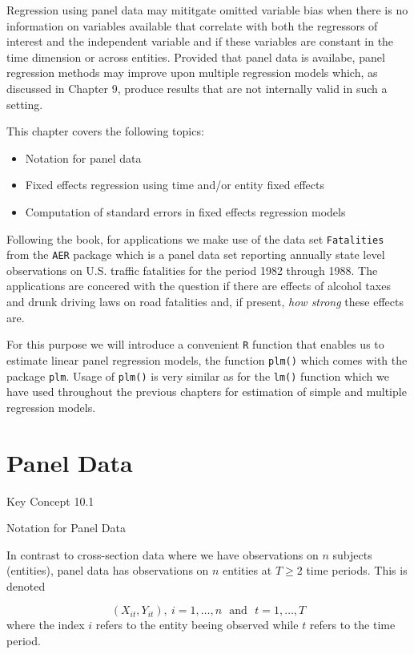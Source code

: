 \documentclass[]{book}
\providecommand{\tightlist}{%
  \setlength{\itemsep}{0pt}\setlength{\parskip}{0pt}}
\theoremstyle{definition}
\theoremstyle{definition}
\theoremstyle{definition}
\theoremstyle{remark}
\begin{document}
Regression using panel data may mititgate omitted variable bias when
there is no information on variables available that correlate with both
the regressors of interest and the independent variable and if these
variables are constant in the time dimension or across entities.
Provided that panel data is availabe, panel regression methods may
improve upon multiple regression models which, as discussed in Chapter
9, produce results that are not internally valid in such a setting.

This chapter covers the following topics:

\begin{itemize}
\tightlist
\item
  Notation for panel data
\item
  Fixed effects regression using time and/or entity fixed effects
\item
  Computation of standard errors in fixed effects regression models
\end{itemize}

Following the book, for applications we make use of the data set
\texttt{Fatalities} from the \texttt{AER} package which is a panel data
set reporting annually state level observations on U.S. traffic
fatalities for the period 1982 through 1988. The applications are
concered with the question if there are effects of alcohol taxes and
drunk driving laws on road fatalities and, if present, \emph{how strong}
these effects are.

For this purpose we will introduce a convenient \texttt{R} function that
enables us to estimate linear panel regression models, the function
\texttt{plm()} which comes with the package \texttt{plm}. Usage of
\texttt{plm()} is very similar as for the \texttt{lm()} function which
we have used throughout the previous chapters for estimation of simple
and multiple regression models.

\section{Panel Data}\label{panel-data}

Key Concept 10.1

Notation for Panel Data

In contrast to cross-section data where we have observations on \(n\)
subjects (entities), panel data has observations on \(n\) entities at
\(T\geq2\) time periods. This is denoted

\[(X_{it},Y_{it}), \ i=1,\dots,n \ \ \ \text{and} \ \ \ t=1,\dots,T \]
where the index \(i\) refers to the entity beeing observed while \(t\)
refers to the time period.
\end{document}
